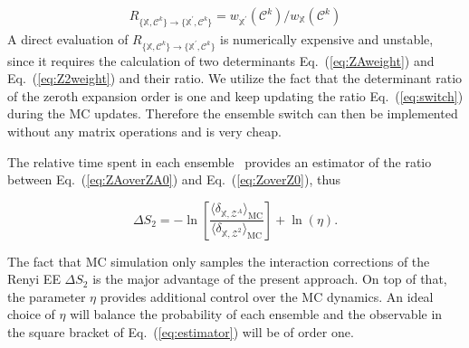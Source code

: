 \documentclass[twocolumn,english,prl,showpacs]{revtex4}
\begin{document}
\begin{eqnarray}
R_{\{\mathbb{X}, \mathcal{C}^{k}\} \rightarrow \{\mathbb{X}^{\prime}, \mathcal{C}^{k}\} } = {w_{\mathbb{X}^{\prime}}(\mathcal{C}^{k})}/{w_{\mathbb{X}}(\mathcal{C}^{k})}
\label{eq:switch}
\end{eqnarray} 
A direct evaluation of $R_{\{\mathbb{X}, \mathcal{C}^{k}\} \rightarrow \{\mathbb{X}^{\prime}, \mathcal{C}^{k}\}}$ is numerically expensive and unstable, since it requires the calculation of two determinants Eq.~(\ref{eq:ZAweight}) and Eq.~(\ref{eq:Z2weight}) and their ratio. We utilize the fact that the determinant ratio of the zeroth expansion order is one and keep updating the ratio Eq.~(\ref{eq:switch}) during the MC updates. Therefore the ensemble switch can then be implemented without any matrix operations and is very cheap. 

The relative time spent in each ensemble~\cite{Humeniuk:2012cq}  provides an estimator of the ratio between Eq.~(\ref{eq:ZAoverZA0}) and Eq.~(\ref{eq:ZoverZ0}), thus 

\begin{equation}
\Delta S_{2} = -\ln\left [\frac{\langle \delta_{\mathbb{X},\mathcal{Z}^{A}} \rangle_\mathrm{MC}}{ \langle \delta _{\mathbb{X}, \mathcal{Z}^{2}} \rangle_\mathrm{MC}} \right ] + \ln(\eta).
\label{eq:estimator}
\end{equation}

The fact that MC simulation only samples the interaction corrections of the Renyi EE $\Delta S_{2}$ is the major advantage of the present approach. On top of that, the parameter $\eta$ provides additional control over the MC dynamics. An ideal choice of $\eta$ will balance the probability of each ensemble and the observable in the square bracket of Eq.~(\ref{eq:estimator}) will be of order one. 

\end{document}
